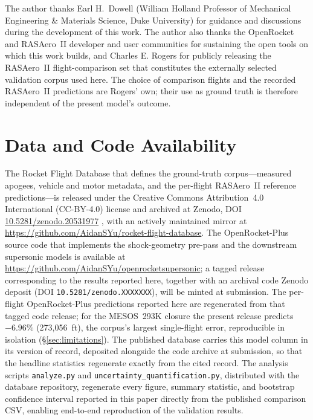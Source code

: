 
The author thanks Earl H.~Dowell (William Holland Professor of Mechanical
Engineering \& Materials Science, Duke University) for guidance and discussions
during the development of this work. The author also thanks the OpenRocket and
RASAero~II developer and user communities for sustaining the open tools on which
this work builds, and Charles E. Rogers for publicly releasing the RASAero~II
flight-comparison set that constitutes the externally selected validation corpus
used here. The choice of comparison flights and the recorded RASAero~II
predictions are Rogers' own; their use as ground truth is therefore independent
of the present model's outcome.

\section*{Data and Code Availability}

The Rocket Flight Database that defines the ground-truth corpus---measured
apogees, vehicle and motor metadata, and the per-flight RASAero~II reference
predictions---is released under the Creative Commons Attribution~4.0 International
(CC-BY-4.0) license and archived at Zenodo, DOI
\href{https://doi.org/10.5281/zenodo.20531977}{10.5281/zenodo.20531977}
\cite{rfd_zenodo}, with an actively maintained mirror at
\url{https://github.com/AidanSYu/rocket-flight-database}. The OpenRocket-Plus
source code that implements the shock-geometry pre-pass and the downstream
supersonic models is available at
\url{https://github.com/AidanSYu/openrocketsupersonic}; a tagged release
corresponding to the results reported here, together with an archival code
Zenodo deposit (DOI \texttt{10.5281/zenodo.XXXXXXX}), will be minted at
submission. The per-flight OpenRocket-Plus predictions reported here are
regenerated from that tagged code release; for the MESOS~293K closure the present
release predicts $-6.96\%$ (273{,}056~ft), the corpus's largest single-flight
error, reproducible in isolation (\S\ref{sec:limitations}). The published database
carries this model column in its version of record, deposited alongside the code
archive at submission, so that the headline statistics regenerate exactly from the
cited record. The analysis scripts \texttt{analyze.py} and
\texttt{uncertainty\_quantification.py}, distributed with the database
repository, regenerate every figure, summary statistic, and bootstrap confidence
interval reported in this paper directly from the published comparison CSV,
enabling end-to-end reproduction of the validation results.


